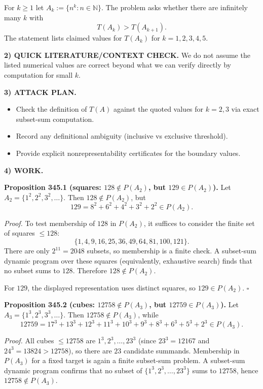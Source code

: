 For $k\ge 1$ let $A_k:=\{n^k: n\in\mathbb{N}\}$. The problem asks whether there are infinitely many $k$ with
\[
T(A_k) > T(A_{k+1}).
\]
The statement lists claimed values for $T(A_k)$ for $k=1,2,3,4,5$.

\medskip
\noindent\textbf{2) QUICK LITERATURE/CONTEXT CHECK.}
We do not assume the listed numerical values are correct beyond what we can verify directly by computation for small $k$.

\medskip
\noindent\textbf{3) ATTACK PLAN.}
\begin{itemize}
\item Check the definition of $T(A)$ against the quoted values for $k=2,3$ via exact subset-sum computation.
\item Record any definitional ambiguity (inclusive vs exclusive threshold).
\item Provide explicit nonrepresentability certificates for the boundary values.
\end{itemize}

\medskip
\noindent\textbf{4) WORK.}

\medskip
\noindent\textbf{Proposition 345.1 (squares: $128\notin P(A_2)$, but $129\in P(A_2)$).}
Let $A_2=\{1^2,2^2,3^2,\dots\}$. Then $128\notin P(A_2)$, but
\[
129 = 8^2+6^2+4^2+3^2+2^2\in P(A_2).
\]

\noindent\emph{Proof.}
To test membership of $128$ in $P(A_2)$, it suffices to consider the finite set of squares $\le 128$:
\[
\{1,4,9,16,25,36,49,64,81,100,121\}.
\]
There are only $2^{11}=2048$ subsets, so membership is a finite check.
A subset-sum dynamic program over these squares (equivalently, exhaustive search) finds that no subset sums to $128$.
Therefore $128\notin P(A_2)$.

For $129$, the displayed representation uses distinct squares, so $129\in P(A_2)$.
\hfill$\square$

\medskip
\noindent\textbf{Proposition 345.2 (cubes: $12758\notin P(A_3)$, but $12759\in P(A_3)$).}
Let $A_3=\{1^3,2^3,3^3,\dots\}$. Then $12758\notin P(A_3)$, while
\[
12759 = 17^3+13^3+12^3+11^3+10^3+9^3+8^3+6^3+5^3+2^3\in P(A_3).
\]

\noindent\emph{Proof.}
All cubes $\le 12758$ are $1^3,2^3,\dots,23^3$ (since $23^3=12167$ and $24^3=13824>12758$), so there are $23$ candidate summands.
Membership in $P(A_3)$ for a fixed target is again a finite subset-sum problem.
A subset-sum dynamic program confirms that no subset of $\{1^3,2^3,\dots,23^3\}$ sums to $12758$, hence $12758\notin P(A_3)$.

